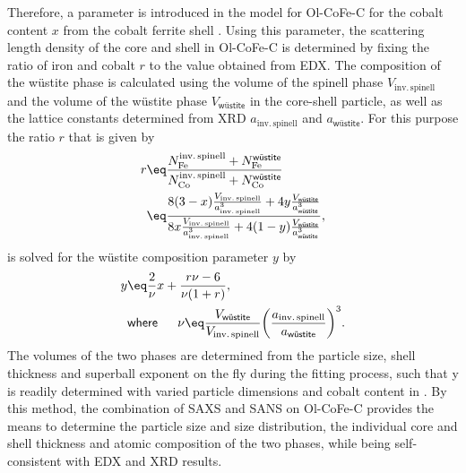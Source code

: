 \documentclass[\main/dresen_thesis.tex]{subfiles}
\begin{document}
    Therefore, a parameter is introduced in the model for Ol-CoFe-C for the cobalt content $x$ from the cobalt ferrite shell .
    Using this parameter, the scattering length density of the core and shell in Ol-CoFe-C is determined by fixing the ratio of iron and cobalt $r$ to the value obtained from EDX.
    The composition of the w\"ustite phase  is calculated using the volume of the spinell phase $V_\mathrm{inv.\,spinell}$ and the volume of the w\"ustite phase $V_\textsf{w\"ustite}$ in the core-shell particle, as well as the lattice constants determined from XRD $a_\mathrm{inv.\,spinell}$ and $a_\textsf{w\"ustite}$.
    For this purpose the ratio $r$ that is given by
    \begin{align}
      \begin{split}
        r &\eq \frac{N_\mathrm{Fe}^\mathrm{inv.\, spinell} + N_\mathrm{Fe}^\textsf{w\"ustite}}
                    {N_\mathrm{Co}^\mathrm{inv.\, spinell} + N_\mathrm{Co}^\textsf{w\"ustite}} \\
          &\eq \frac
                 {8 (3-x) \frac{V_\mathrm{inv.\,spinell}}{a_\mathrm{inv.\,spinell}^3} +
                  4 y \frac{V_\textsf{w\"ustite}}{a_\textsf{w\"ustite}^3}}
                 {8 x \frac{V_\mathrm{inv.\,spinell}}{a_\mathrm{inv.\,spinell}^3} +
                  4 (1-y) \frac{V_\textsf{w\"ustite}}{a_\textsf{w\"ustite}^3}},
      \end{split}
    \end{align}
    is solved for the w\"ustite composition parameter $y$ by
    \begin{align}
      y &\eq \frac{2}{\nu} x + \frac{r \nu - 6}{\nu (1 + r)},\\
        & \textsf{where\,} \hspace{0.5cm} \nu \eq \frac{V_\textsf{w\"ustite}}{V_\mathrm{inv.\,spinell}} \biggl( \frac{a_\mathrm{inv.\,spinell}}{a_\textsf{w\"ustite}} \biggr)^3.
    \end{align}
    The volumes of the two phases are determined from the particle size, shell thickness and superball exponent on the fly during the fitting process, such that y is readily determined with varied particle dimensions and cobalt content in .
    By this method, the combination of SAXS and SANS on Ol-CoFe-C provides the means to determine the particle size and size distribution, the individual core and shell thickness and atomic composition of the two phases, while being self-consistent with EDX and XRD results.
\end{document}
